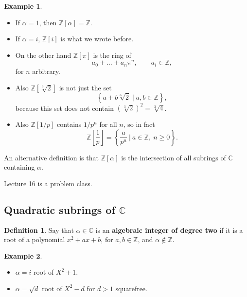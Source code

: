 \documentclass{article}
\newcommand{\Z}{\mathbb{Z}}
\newcommand{\C}{\mathbb{C}}
\newcommand{\rb}[1]{\left( #1 \right)}
\renewcommand{\sb}[1]{\left[ #1 \right]}
\newcommand{\cb}[1]{\left\{ #1 \right\}}
\theoremstyle{definition}\newtheorem{definition}{Definition}
\theoremstyle{definition}\newtheorem{remark}[definition]{Remark}
\theoremstyle{definition}\newtheorem*{example}{Example}
\theoremstyle{definition}\newtheorem*{note}{Note}
\begin{document}
\begin{example}
\hfill
\begin{itemize}
\item If $ \alpha = 1 $, then $ \Z\sb{\alpha} = \Z $.
\item If $ \alpha = i $, $ \Z\sb{i} $ is what we wrote before.
\item On the other hand $ \Z\sb{\pi} $ is the ring of
$$ a_0 + \dots + a_n\pi^n, \qquad a_i \in \Z, $$
for $ n $ arbitrary.
\item Also $ \Z\sb{\sqrt[3]{2}} $ is not just the set
$$ \cb{a + b\sqrt[3]{2} \mid a, b \in \Z}, $$
because this set does not contain $ \rb{\sqrt[3]{2}}^2 = \sqrt[3]{4} $.
\item Also $ \Z\sb{1 / p} $ contains $ 1 / p^n $ for all $ n $, so in fact
$$ \Z\sb{\dfrac{1}{p}} = \cb{\dfrac{a}{p^n} \ \Bigg| \ a \in \Z, \ n \ge 0}. $$
\end{itemize}
\end{example}

An alternative definition is that $ \Z\sb{\alpha} $ is the intersection of all subrings of $ \C $ containing $ \alpha $.


Lecture 16 is a problem class.


\subsection{Quadratic subrings of $ \C $}

\begin{definition}
Say that $ \alpha \in \C $ is an \textbf{algebraic integer of degree two} if it is a root of a polynomial $ x^2 + ax + b $, for $ a, b \in \Z $, and $ \alpha \notin \Z $.
\end{definition}

\begin{example}
\hfill
\begin{itemize}
\item $ \alpha = i $ root of $ X^2 + 1 $.
\item $ \alpha = \sqrt{d} $ root of $ X^2 - d $ for $ d > 1 $ squarefree.
\end{itemize}
\end{example}
\end{document}
